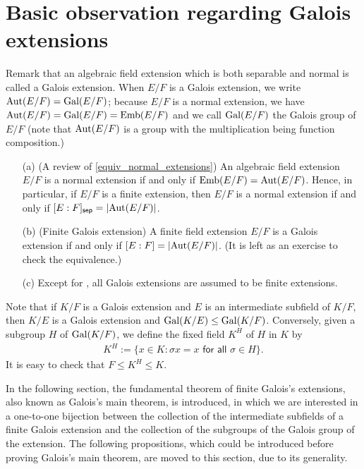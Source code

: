 \section{Basic observation regarding Galois extensions}

Remark that an algebraic field extension which is both separable and normal is called a Galois extension.
When $E/F$ is a Galois extension, we write ${\textrm{Aut}({E/F})}={\textrm{Gal}({E/F})}$; because $E/F$ is a normal extension, we have ${\textrm{Aut}({E/F})}={\textrm{Gal}({E/F})}={\textrm{Emb}({E/F})}$ and we call ${\textrm{Gal}({E/F})}$ the Galois group of $E/F$ (note that ${\textrm{Aut}({E/F})}$ is a group with the multiplication being function composition.)
\begin{rmk}
    \begin{enumerate}
        \item[(a)]
        {
            (A review of \cref{equiv_normal_extensions})
            An algebraic field extension $E/F$ is a normal extension if and only if ${\textrm{Emb}({E/F})}={\textrm{Aut}({E/F})}$.
            Hence, in particular, if $E/F$ is a finite extension, then $E/F$ is a normal extension if and only if $[E:F]_{\textsf{sep}}=|{\textrm{Aut}({E/F})}|$.
        }
        \item[(b)]
        {
            (Finite Galois extension)
            A finite field extension $E/F$ is a Galois extension if and only if $[E:F]=|{\textrm{Aut}({E/F})}|$.
            \color{brown}(It is left as an exercise to check the equivalence.)\color{black}
        }
        \item[(c)]
        {
            Except for , all Galois extensions are assumed to be finite extensions.
        }
    \end{enumerate}
\end{rmk}

Note that if $K/F$ is a Galois extension and $E$ is an intermediate subfield of $K/F$, then $K/E$ is a Galois extension and ${\textrm{Gal}({K/E})}\leq{\textrm{Gal}({K/F})}$.
Conversely, given a subgroup $H$ of ${\textrm{Gal}({K/F})}$, we define the fixed field $K^H$ of $H$ in $K$ by
\begin{align*}
    K^H:=\{x\in K: \textsf{$\sigma x=x$ for all $\sigma\in H$}\}.
\end{align*}
It is easy to check that $F\leq K^H\leq K$.

In the following section, the fundamental theorem of finite Galois's extensions, also known as Galois's main theorem, is introduced, in which we are interested in a one-to-one bijection between the collection of the intermediate subfields of a finite Galois extension and the collection of the subgroups of the Galois group of the extension.
The following propositions, which could be introduced before proving Galois's main theorem, are moved to this section, due to its generality.

